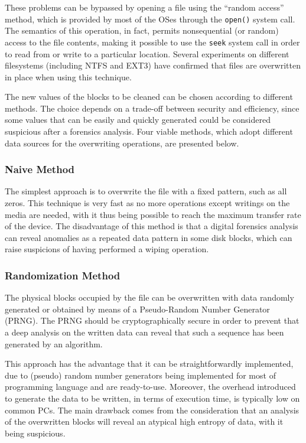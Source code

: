 \documentclass[10pt, conference, compsocconf]{IEEEtran}
\begin{document}
These problems can be bypassed by opening a file using the ``random access'' method, which is provided by most of the OSes through the \verb=open()= system call. The semantics of this operation, in fact, permits nonsequential (or random) access to the file contents, making it possible to use the \verb=seek= system call in order to read from or write to a particular location.
Several experiments on different filesystems (including NTFS and EXT3) have confirmed that files are overwritten in place when using this technique.

The new values of the blocks to be cleaned can be chosen according to different methods. The choice depends on a trade-off between security and efficiency, since some values that can be easily and quickly generated could be considered suspicious after a forensics analysis. Four viable methods, which adopt different data sources for the overwriting operations, are presented below.

\subsubsection{Naive Method}
The simplest approach is to overwrite the file with a fixed pattern, such as all zeros. This technique is very fast as no more operations except writings on the media are needed, with it thus being possible to reach the maximum transfer rate of the device. The disadvantage of this method is that a digital forensics analysis can reveal anomalies as a repeated data pattern in some disk blocks, which can raise suspicions of having performed a wiping operation.

\subsubsection{Randomization Method}
The physical blocks occupied by the file can be overwritten with data randomly generated or obtained by means of a Pseudo-Random Number Generator (PRNG). The PRNG should be cryptographically secure in order to prevent that a deep analysis on the written data can reveal that such a sequence has been generated by an algorithm.

\noindent This approach has the advantage that it can be straightforwardly implemented, due to (pseudo) random number generators being implemented for most of programming language and are ready-to-use. Moreover, the overhead introduced to generate the data to be written, in terms of execution time, is typically low on common PCs. The main drawback comes from the consideration that an analysis of the overwritten blocks will reveal an atypical high entropy of data, with it being suspicious.
\end{document}
